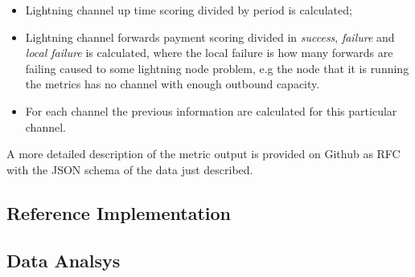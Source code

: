 \begin{itemize}
    \item Lightning channel up time scoring divided by period is calculated;
    \item Lightning channel forwards payment scoring divided in \emph{success}, \emph{failure} and \emph{local failure}
        is calculated, where the local failure is how many forwards are failing caused to some lightning node problem,
        e.g the node that it is running the metrics has no channel with enough outbound capacity. 
    \item For each channel the previous information are calculated for this particular channel.
\end{itemize}

A more detailed description of the metric output is provided on Github as RFC with the JSON schema 
of the data just described. 

\subsection{Reference Implementation}


\subsection{Data Analsys}


